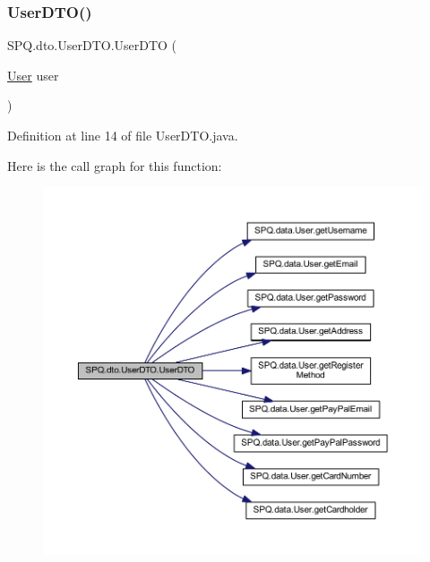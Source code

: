\subsubsection{\texorpdfstring{User\+D\+T\+O()}{UserDTO()}\hspace{0.1cm}{\footnotesize\ttfamily [1/11]}}
{\footnotesize\ttfamily S\+P\+Q.\+dto.\+User\+D\+T\+O.\+User\+D\+TO (\begin{DoxyParamCaption}\item[{\mbox{\hyperlink{class_s_p_q_1_1data_1_1_user}{User}}}]{user }\end{DoxyParamCaption})}



Definition at line 14 of file User\+D\+T\+O.\+java.

Here is the call graph for this function\+:
\nopagebreak
\begin{figure}[H]
\begin{center}
\leavevmode
\includegraphics[width=350pt]{class_s_p_q_1_1dto_1_1_user_d_t_o_a40cad7b1dea2117ed4cb0e69fdc6b929_cgraph}
\end{center}
\end{figure}
\mbox{\label{class_s_p_q_1_1dto_1_1_user_d_t_o_a985590805ac057d894623b83b1042e29}} 
